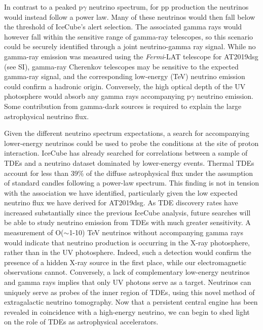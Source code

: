 \documentclass{nature_plusfigure}
\begin{document}
In contrast to a peaked p$\gamma$ neutrino spectrum, for pp production the neutrinos would instead follow a power law. Many of these neutrinos would then fall below the threshold of IceCube's alert selection. The associated gamma rays would however fall within the sensitive range of gamma-ray telescopes, so this scenario could be securely identified through a joint neutrino-gamma ray signal. While no gamma-ray emission was measured using the \textit{Fermi}-LAT telescope for AT2019dsg (see SI), gamma-ray Cherenkov telescopes may be sensitive to the expected gamma-ray signal, and the corresponding low-energy (TeV) neutrino emission could confirm a hadronic origin. Conversely, the high optical depth of the UV photosphere would absorb any gamma rays accompanying p$\gamma$ neutrino emission\cite{2016PhRvD..93h3005W}. Some contribution from gamma-dark sources is required to explain the large astrophysical neutrino flux\cite{2016PhRvL.116g1101M}.

Given the different neutrino spectrum expectations, a search for accompanying lower-energy neutrinos could be used to probe the conditions at the site of proton interaction. IceCube has already searched for correlations between a sample of TDEs and a neutrino dataset dominated by lower-energy events\cite{2019ICRC...36.1016S}. Thermal TDEs account for less than 39\% of the diffuse astrophysical flux under the assumption of standard candles following a power-law spectrum. This finding is not in tension with the association we have identified, particularly given the low expected neutrino flux we have derived for AT2019dsg. As TDE discovery rates have increased substantially since the previous IceCube analysis\cite{2020arXiv200101409V, 2019ICRC...36.1016S}, future searches will be able to study neutrino emission from TDEs with much greater sensitivity. A measurement of O($\sim$1-10) TeV neutrinos without accompanying gamma rays would indicate that neutrino production is occurring in the X-ray photosphere, rather than in the UV photosphere. Indeed, such a detection would confirm the presence of a hidden X-ray source in the first place, while our electromagnetic observations cannot. Conversely, a lack of complementary low-energy neutrinos and gamma rays implies that only UV photons serve as a target. Neutrinos can uniquely serve as probes of the inner region of TDEs, using this novel method of extragalactic neutrino tomography. Now that a persistent central engine has been revealed in coincidence with a high-energy neutrino, we can begin to shed light on the role of TDEs as astrophysical accelerators.
\end{document}
